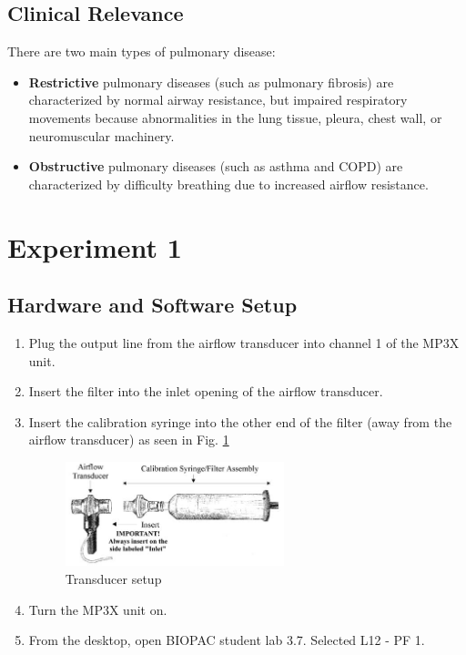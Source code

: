 \documentclass{article}
\begin{document}
\subsection*{Clinical Relevance}
There are two main types of pulmonary disease:
\begin{itemize}
	\item \textbf{Restrictive} pulmonary diseases (such as pulmonary fibrosis) are characterized by normal airway resistance, but impaired respiratory movements because abnormalities in the lung tissue, pleura, chest wall, or neuromuscular machinery.
	\item \textbf{Obstructive} pulmonary diseases (such as asthma and COPD) are characterized by difficulty breathing due to increased airflow resistance.
\end{itemize}

\section*{Experiment 1}
\subsection*{Hardware and Software Setup}
\begin{enumerate}
	\item Plug the output line from the airflow transducer into channel 1 of the MP3X unit.
	\item Insert the filter into the inlet opening of the airflow transducer.
	\item Insert the calibration syringe into the other end of the filter (away from the airflow transducer) as seen in Fig. \ref{xdc}
		\begin{figure}[h]
	\centering\includegraphics[width=0.6\textwidth]{../images/PF_I_4.jpg}
		\caption{Transducer setup}
		\label{xdc}
		\end{figure}
		
	\item Turn the MP3X unit on.
	\item From the desktop, open BIOPAC student lab 3.7. Selected L12 - PF 1.
\end{enumerate}
\end{document}

